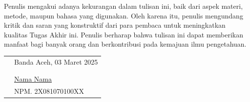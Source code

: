 
Penulis mengakui adanya kekurangan dalam tulisan ini, baik dari aspek materi, metode, maupun bahasa yang digunakan. Oleh karena itu, penulis mengundang kritik dan saran yang konstruktif dari para pembaca untuk meningkatkan kualitas Tugas Akhir ini. Penulis berharap bahwa tulisan ini dapat memberikan manfaat bagi banyak orang dan berkontribusi pada kemajuan ilmu pengetahuan.

\vspace{1cm}

\begin{tabular}{p{7.5cm}l}
	&Banda Aceh, 03 Maret 2025\\
	&\\
	&\\
	&\multirow{1.5}{7.5cm}{\underline{Nama Nama}} \\ 
	&NPM. 2X081070100XX \\
\end{tabular}
